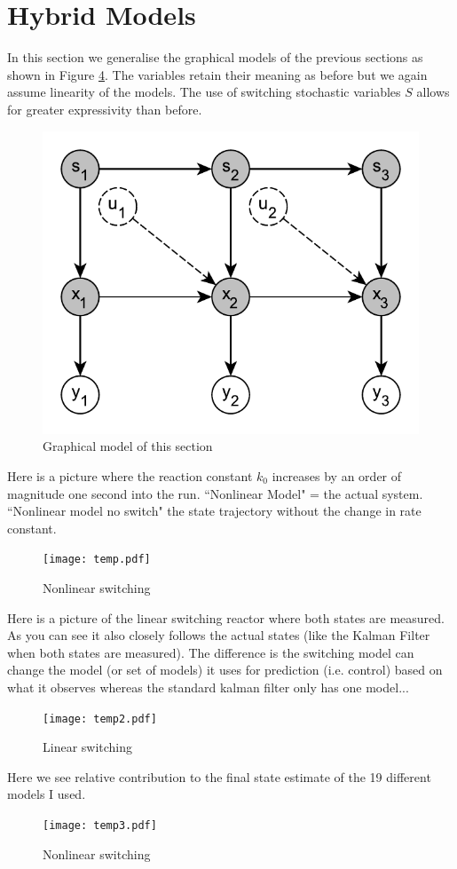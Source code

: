\documentclass[../masters.tex]{subfiles}
\begin{document}
\graphicspath{{./imgs/}{../imgs/}} %

\section{Hybrid Models}
In this section we generalise the graphical models of the previous sections as shown in Figure \ref{fig_hybridmod}. The variables retain their meaning as before but we again assume linearity of the models. The
use of switching stochastic variables $S$ allows for greater expressivity than before.     
\begin{figure}[H] 
\centering
\includegraphics[scale=1.0]{hybrid_model.pdf}
\caption{Graphical model of this section}
\label{fig_hybridmod}
\end{figure}

Here is a picture where the reaction constant $k_0$ increases by an order of magnitude one second into the run. ``Nonlinear Model" = the actual system. ``Nonlinear model no switch" the state trajectory without the change in rate constant.
\begin{figure}[H] 
\centering
\texttt{[image: temp.pdf]}
\caption{Nonlinear switching}
\label{fig_hybridmod}
\end{figure}

Here is a picture of the linear switching reactor where both states are measured. As you can see it also closely follows the actual states (like the Kalman Filter when both states are measured). The difference is the switching model can change the model (or set of models) it uses for prediction (i.e. control) based on what it observes whereas the standard kalman filter only has one model... 
\begin{figure}[H] 
\centering
\texttt{[image: temp2.pdf]}
\caption{Linear switching}
\label{fig_hybridmod}
\end{figure}
Here we see relative contribution to the final state estimate of the 19 different models I used.
\begin{figure}[H] 
\centering
\texttt{[image: temp3.pdf]}
\caption{Nonlinear switching}
\label{fig_hybridmod}
\end{figure}


%
%
\end{document}
